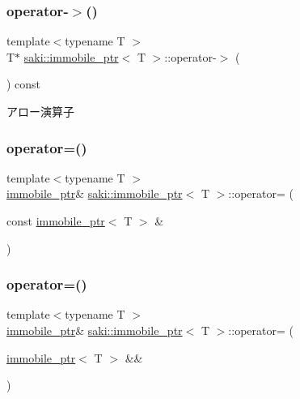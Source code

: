\subsubsection{\texorpdfstring{operator-\/$>$()}{operator->()}}
{\footnotesize\ttfamily template$<$typename T $>$ \\
T$\ast$ \mbox{\hyperlink{classsaki_1_1immobile__ptr}{saki\+::immobile\+\_\+ptr}}$<$ T $>$\+::operator-\/$>$ (\begin{DoxyParamCaption}{ }\end{DoxyParamCaption}) const\hspace{0.3cm}{\ttfamily [inline]}}



アロー演算子 

\mbox{\label{classsaki_1_1immobile__ptr_aeda073b50b1e44b9aacf91ac6ba3891b}} 
\subsubsection{\texorpdfstring{operator=()}{operator=()}\hspace{0.1cm}{\footnotesize\ttfamily [1/2]}}
{\footnotesize\ttfamily template$<$typename T $>$ \\
\mbox{\hyperlink{classsaki_1_1immobile__ptr}{immobile\+\_\+ptr}}\& \mbox{\hyperlink{classsaki_1_1immobile__ptr}{saki\+::immobile\+\_\+ptr}}$<$ T $>$\+::operator= (\begin{DoxyParamCaption}\item[{const \mbox{\hyperlink{classsaki_1_1immobile__ptr}{immobile\+\_\+ptr}}$<$ T $>$ \&}]{ }\end{DoxyParamCaption})\hspace{0.3cm}{\ttfamily [delete]}}

\mbox{\label{classsaki_1_1immobile__ptr_a8b4e02a03c73cf8009248ebb0adfba7f}} 
\subsubsection{\texorpdfstring{operator=()}{operator=()}\hspace{0.1cm}{\footnotesize\ttfamily [2/2]}}
{\footnotesize\ttfamily template$<$typename T $>$ \\
\mbox{\hyperlink{classsaki_1_1immobile__ptr}{immobile\+\_\+ptr}}\& \mbox{\hyperlink{classsaki_1_1immobile__ptr}{saki\+::immobile\+\_\+ptr}}$<$ T $>$\+::operator= (\begin{DoxyParamCaption}\item[{\mbox{\hyperlink{classsaki_1_1immobile__ptr}{immobile\+\_\+ptr}}$<$ T $>$ \&\&}]{ }\end{DoxyParamCaption})\hspace{0.3cm}{\ttfamily [delete]}}


